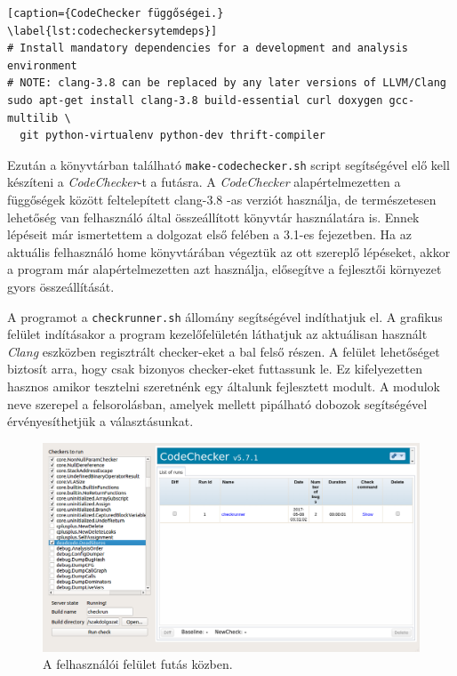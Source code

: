 \documentclass[a4paper,12pt]{report}
\begin{document}
\begin{lstlisting}[caption={CodeChecker függőségei.}
\label{lst:codecheckersytemdeps}]
# Install mandatory dependencies for a development and analysis environment
# NOTE: clang-3.8 can be replaced by any later versions of LLVM/Clang
sudo apt-get install clang-3.8 build-essential curl doxygen gcc-multilib \
  git python-virtualenv python-dev thrift-compiler
\end{lstlisting}

Ezután a könyvtárban található \texttt{make-codechecker.sh} script segítségével elő kell készíteni a \emph{CodeChecker}-t a futásra. A \emph{CodeChecker} alapértelmezetten a függőségek között feltelepített clang-3.8 -as verziót használja, de természetesen lehetőség van felhasználó által összeállított könyvtár használatára is. Ennek lépéseit már ismertettem a dolgozat első felében a 3.1-es fejezetben. Ha az aktuális felhasználó home könyvtárában végeztük az ott szereplő lépéseket, akkor a program már alapértelmezetten azt használja, elősegítve a fejlesztői környezet gyors összeállítását.

A programot a \texttt{checkrunner.sh} állomány segítségével indíthatjuk el. A grafikus felület indításakor a program kezelőfelületén láthatjuk az aktuálisan használt \emph{Clang} eszközben regisztrált checker-eket a bal felső részen. A felület lehetőséget biztosít arra, hogy csak bizonyos checker-eket futtassunk le. Ez kifelyezetten hasznos amikor tesztelni szeretnénk egy általunk fejlesztett modult. A modulok neve szerepel a felsorolásban, amelyek mellett pipálható dobozok segítségével érvényesíthetjük a választásunkat.


\begin{figure}[h]
\caption{A felhasználói felület futás közben.}
\centering
\includegraphics[scale=0.36]{ui.png}
\end{figure}
\end{document}
